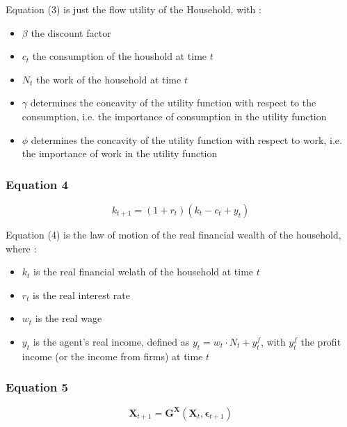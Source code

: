 \documentclass{article}
\begin{document}
Equation (3) is just the flow utility of the Household, with : 
\begin{itemize}
    \item $\beta$ the discount factor
    \item $c_{t}$ the consumption of the houshold at time $t$
    \item $N_{t}$ the work of the household at time $t$
    \item $\gamma$ determines the concavity of the utility function with respect to the consumption, i.e. the importance of consumption in the utility function
    \item $\phi$ determines the concavity of the utility function with respect to work, i.e. the importance of work in the utility function
\end{itemize}


\subsubsection*{Equation 4}
\begin{equation}
    k_{t+1}=(1+r_t)(k_{t}-c_{t}+y_{t})
\end{equation}

Equation (4) is the law of motion of the real financial wealth of the household, where : 
\begin{itemize}
    \item $k_t$ is the real financial welath of the household at time $t$
    \item $r_t$ is the real interest rate
    \item $w_t$ is the real wage
    \item $y_t$ is the agent's real income, defined as $y_t=w_t\cdot N_{t}+y_{t}^{f}$, with $y_{t}^{f}$ the profit income (or the income from firms) at time $t$
\end{itemize}

\subsubsection*{Equation 5}

\begin{equation}
    \bm{X}_{t+1}=\bm{G}^{\bm{X}}\left(\bm{X}_{t},\bm{\epsilon}_{t+1}\right)
\end{equation}
\end{document}
